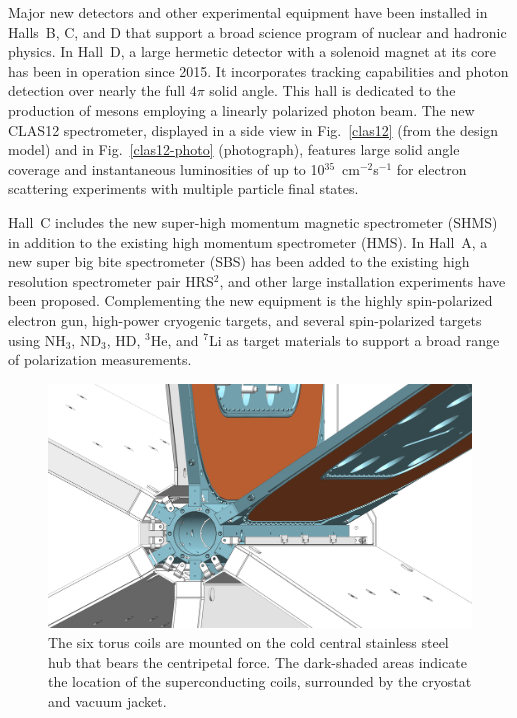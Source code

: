\documentclass[final,3p,twocolumn]{elsarticle}
\begin{document}
Major new detectors and other experimental equipment have been installed in Halls~B, C, and D that support a
broad science program of nuclear and hadronic physics. In Hall~D, a large hermetic detector with a solenoid magnet
at its core has been in operation since 2015. It incorporates tracking capabilities and photon detection over nearly
the full $4\pi$ solid angle. This hall is dedicated to the production of mesons employing a linearly polarized photon
beam. The new CLAS12 spectrometer, displayed in a side view in Fig.~\ref{clas12} (from the design model) and in
Fig.~\ref{clas12-photo} (photograph), features large solid angle coverage and instantaneous luminosities of up to
10$^{35}$~cm$^{-2}$s$^{-1}$ for electron scattering experiments with multiple particle final states. 

Hall~C includes the new super-high momentum magnetic spectrometer (SHMS) in addition to the existing high
momentum spectrometer (HMS). In Hall~A, a new super big bite spectrometer (SBS) has been added to the
existing high resolution spectrometer pair HRS$^2$, and other large installation experiments have been proposed.
Complementing the new equipment is the highly spin-polarized electron gun, high-power cryogenic targets, and
several spin-polarized targets using NH$_3$, ND$_3$, HD, $^3$He, and $^7$Li as target materials to support a
broad range of polarization measurements.   

\begin{figure}[htbp!]
\centerline{\includegraphics[width=1.00\columnwidth]{torus-hub-2.png}}
\caption{The six torus coils are mounted on the cold central stainless steel hub that bears the centripetal force. The
dark-shaded areas indicate the location of the superconducting coils, surrounded by the cryostat and vacuum jacket.}
\label{coil-mount}
\end{figure}
\end{document}
